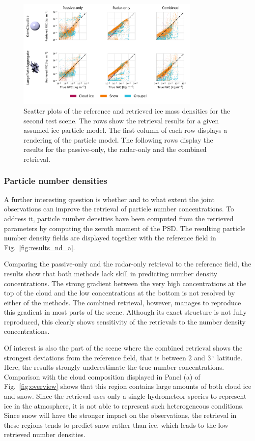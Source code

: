 \documentclass[journal abbreviation, manuscript]{copernicus}
\begin{document}
\begin{figure}
\centering
\includegraphics[width = 0.8\textwidth]{../plots/results_scatter_b_1}
\caption{Scatter plots of the reference and retrieved ice mass densities for
  the second test scene. The rows show the retrieval results for a given
  assumed ice particle model. The first column of each row displays a rendering
  of the particle model. The following rows display the results for the
  passive-only, the radar-only and the combined retrieval.}
\label{fig:results_scatter_b_1}
\end{figure}


\subsubsection{Particle number densities}

A further interesting question is whether and to what extent the joint
observations can improve the retrieval of particle number concentrations.
To address it, particle number densities have been computed from the
retrieved parameters by computing the zeroth moment of the PSD. The resulting
particle number density fields are displayed together with the reference
field in Fig.~\ref{fig:results_nd_a}.

Comparing the passive-only and the radar-only retrieval to the reference
field, the results show that both methods lack skill in predicting number
density concentrations. The strong gradient between the very high concentrations
at the top of the cloud and the low concentrations at the bottom is not resolved
by either of the methods. The combined retrieval, however, manages to reproduce
this gradient in most parts of the scene. Although its exact structure
is not fully reproduced, this clearly shows sensitivity of the retrievals to
the number density concentrations.

Of interest is also the part of the scene where the combined retrieval shows the
strongest deviations from the reference field, that is between $2$ and
$3\ \unit{^\circ}$ latitude. Here, the results strongly underestimate the true
number concentrations. Comparison with the cloud composition displayed in Panel (a)
of Fig.~\ref{fig:overview} shows that this region contains large amounts of both
cloud ice and snow. Since the retrieval uses only a single hydrometeor species
to represent ice in the atmosphere, it is not able to represent such
heterogeneous conditions. Since snow will have the stronger impact on the
observations, the retrieval in these regions tends to predict snow rather than
ice, which leads to the low retrieved number densities.
\end{document}
